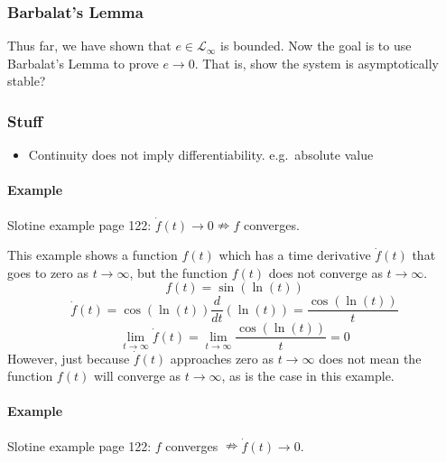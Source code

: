 \subsubsection{Barbalat's Lemma}

Thus far, we have shown that $e\in\mathcal{L}_{\infty}$ is bounded.
Now the goal is to use Barbalat's Lemma to prove $e\rightarrow0$.
That is, show the system is asymptotically stable?

\subsubsection{Stuff}
\begin{itemize}
  \item{%
    Continuity does not imply differentiability.\@
    e.g.\ absolute value
  }
\end{itemize}

\paragraph{Example} Slotine example page 122: $\dot{f}(t)\rightarrow0\nRightarrow f$ converges.

This example shows a function $f(t)$ which has a time derivative $\dot{f}(t)$ that goes to zero as $t\rightarrow\infty$, but the function $f(t)$ does not converge as $t\rightarrow\infty$.
\begin{equation*}
  f(t)=\sin(\ln(t))
\end{equation*}
\begin{equation*}
  \dot{f}(t)=\cos(\ln(t))\frac{d}{dt}(\ln(t))=\frac{\cos(\ln(t))}{t}
\end{equation*}
\begin{equation*}
  \lim_{t\rightarrow\infty}\dot{f}(t)=\lim_{t\rightarrow\infty}\frac{\cos(\ln(t))}{t}=0
\end{equation*}
However, just because $\dot{f}(t)$ approaches zero as $t\rightarrow\infty$ does not mean the function $f(t)$ will converge as $t\rightarrow\infty$, as is the case in this example.

\paragraph{Example} Slotine example page 122: $f$ converges $\nRightarrow \dot{f}(t)\rightarrow0$.

